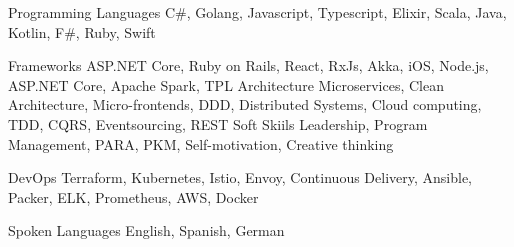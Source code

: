 

\begin{cvskills}

  \cvskill
    {Programming Languages} %
    {C\#, Golang, Javascript, Typescript, Elixir, Scala, Java, Kotlin, F\#, Ruby, Swift } %

  \cvskill
    {Frameworks} %
    {ASP.NET Core, Ruby on Rails, React, RxJs, Akka, iOS, Node.js, ASP.NET Core,
    Apache Spark, TPL} %
  \cvskill
    {Architecture} %
    {Microservices, Clean Architecture, Micro-frontends, DDD, Distributed
    Systems, \newline Cloud computing, TDD, CQRS, Eventsourcing, REST } %
  \cvskill
    {Soft Skiils} %
    {Leadership, Program Management, PARA, PKM, Self-motivation, Creative thinking} %

  \cvskill
    {DevOps} %
    { Terraform, Kubernetes, Istio, Envoy, Continuous Delivery, Ansible, Packer,
    ELK, Prometheus,
    AWS, Docker } %

\cvskill
{Spoken Languages} %
{ English, Spanish, German} %

\end{cvskills}
